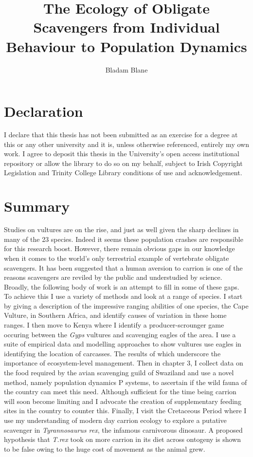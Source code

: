 \documentclass[twoside,12pt]{mythesis} %
\title{The \uppercase{e}cology of \uppercase{o}bligate \uppercase{s}cavengers from \uppercase{i}ndividual \uppercase{b}ehaviour to \uppercase{p}opulation \uppercase{d}ynamics}
\author{Bladam Blane}
\begin{document}


\maketitle %

\chapter*{Declaration}
I declare that this thesis has not been submitted as an exercise for a degree at this or any other university and it is, unless otherwise referenced, entirely my own work.
I agree to deposit this thesis in the University's open access institutional repository or allow the library to do so on my behalf, subject to Irish Copyright Legislation and Trinity College Library conditions of use and acknowledgement.

\vspace{10 mm}


\chapter*{Summary}
Studies on vultures are on the rise, and just as well given the sharp declines in many of the 23 species. Indeed it seems these population crashes are responsible for this research boost. However, there remain obvious gaps in our knowledge when it comes to the world's only terrestrial example of vertebrate obligate scavengers. It has been suggested that a human aversion to carrion is one of the reasons scavengers are reviled by the public and understudied by science. Broadly, the following body of work is an attempt to fill in some of these gaps. To achieve this I use a variety of methods and look at a range of species. I start by giving a description of the impressive ranging abilities of one species, the Cape Vulture, in Southern Africa, and identify causes of variation in these home ranges. I then move to Kenya where I identify a producer-scrounger game occuring between the \textit{Gyps} vultures and scavenging eagles of the area. I use a suite of empirical data and modelling approaches to show vultures use eagles in identifying the location of carcasses. The results of which underscore the importance of ecosystem-level management. Then in chapter 3, I collect data on the food required by the avian scavenging guild of Swaziland and use a novel method, namely population dynamics P systems, to ascertain if the wild fauna of the country can meet this need. Although sufficient for the time being carrion will soon become limiting and I advocate the creation of supplementary feeding sites in the country to counter this. Finally, I visit the Cretaceous Period where I use my understanding of modern day carrion ecology to explore a putative scavenger in \textit{Tyrannosaurus rex}, the infamous carnivorous dinosaur. A proposed hypothesis that \textit{T.rex} took on more carrion in its diet across ontogeny is shown to be false owing to the huge cost of movement as the animal grew. 
\end{document}
